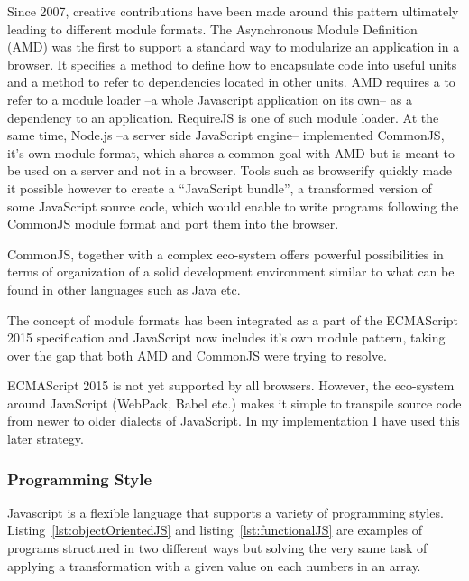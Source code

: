 Since 2007, creative contributions have been made around this pattern ultimately leading to different module formats. The Asynchronous Module Definition (AMD) was the first to support a standard way to modularize an application in a browser. It specifies a method to define how to encapsulate code into useful units and a method to refer to dependencies located in other units. AMD requires a to refer to a module loader --a whole Javascript application on its own-- as a dependency to an application. RequireJS is one of such module loader. At the same time, Node.js --a server side JavaScript engine-- implemented CommonJS, it's own module format, which shares a common goal with AMD but is meant to be used on a server and not in a browser. Tools such as browserify quickly made it possible however to create a ``JavaScript bundle'', a transformed version of some JavaScript source code, which would enable to write programs following the CommonJS module format and port them into the browser. 

CommonJS, together with a complex eco-system offers powerful possibilities in terms of organization of a solid development environment similar to what can be found in other languages such as Java etc.

The concept of module formats has been integrated as a part of the ECMAScript 2015 specification and JavaScript now includes it's own module pattern, taking over the gap that both AMD and CommonJS were trying to resolve.

ECMAScript 2015 is not yet supported by all browsers. However, the eco-system around JavaScript (WebPack, Babel etc.) makes it simple to transpile source code from newer to older dialects of JavaScript. In my implementation I have used this later strategy.

\subsubsection{Programming Style}

Javascript is a flexible language that supports a variety of programming styles. Listing~\ref{lst:objectOrientedJS} and listing~\ref{lst:functionalJS} are examples of programs structured in two different ways but solving the very same task of applying a transformation with a given value on each numbers in an array. 




